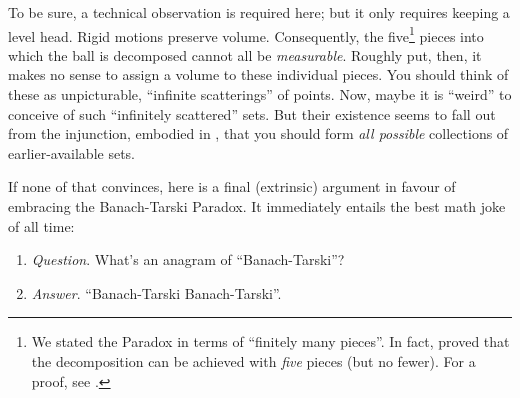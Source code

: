 \documentclass[../../../include/open-logic-section]{subfiles}
\begin{document}
To be sure, a technical observation is required here; but it only
requires keeping a level head. Rigid motions preserve volume.
Consequently, the five\footnote{We stated the Paradox in terms of
``finitely many pieces''. In fact, \citet{Robinson1947} proved that
the decomposition can be achieved with \emph{five} pieces
(but no fewer). For a proof, see \citet[pp.~66--7]{Wagon2016}.} pieces
into which the ball is decomposed cannot all be \emph{measurable}.
Roughly put, then, it makes no sense to assign a volume to these
individual pieces. You should think of these as unpicturable,
``infinite scatterings'' of points. Now, maybe it is ``weird'' to
conceive of such ``infinitely scattered'' sets. But their existence
seems to fall out from the injunction, embodied in \stagesacc{}, that
you should form \emph{all possible} collections of earlier-available
sets. 

If none of that convinces, here is a final (extrinsic) argument in
favour of embracing the Banach-Tarski Paradox. It immediately entails
the best math joke of all time:
\begin{enumerate}
	\item[] \emph{Question}. What's an anagram of ``Banach-Tarski''? 
	\item[] \emph{Answer}. ``Banach-Tarski Banach-Tarski''.
\end{enumerate}
\end{document}
